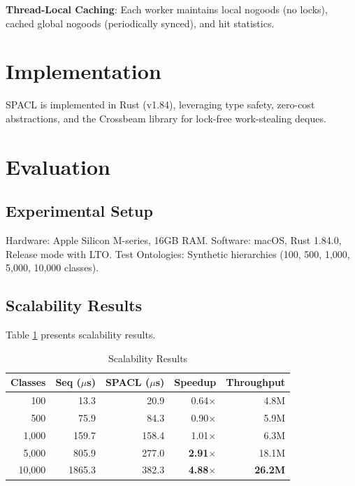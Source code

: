 \documentclass[10pt,a4paper]{article}
\begin{document}
\textbf{Thread-Local Caching}: Each worker maintains local nogoods (no locks), cached global nogoods (periodically synced), and hit statistics.

\section{Implementation}
\label{sec:implementation}

SPACL is implemented in Rust (v1.84), leveraging type safety, zero-cost abstractions, and the Crossbeam library for lock-free work-stealing deques.

\section{Evaluation}
\label{sec:evaluation}

\subsection{Experimental Setup}

Hardware: Apple Silicon M-series, 16GB RAM. Software: macOS, Rust 1.84.0, Release mode with LTO. Test Ontologies: Synthetic hierarchies (100, 500, 1,000, 5,000, 10,000 classes).

\subsection{Scalability Results}

Table \ref{tab:scalability} presents scalability results.

\begin{table}[h]
\centering
\caption{Scalability Results}
\label{tab:scalability}
\begin{tabular}{r|r|r|r|r}
\toprule
\textbf{Classes} & \textbf{Seq ($\mu$s)} & \textbf{SPACL ($\mu$s)} & \textbf{Speedup} & \textbf{Throughput} \\
\midrule
100 & 13.3 & 20.9 & 0.64$\times$ & 4.8M \\
500 & 75.9 & 84.3 & 0.90$\times$ & 5.9M \\
1,000 & 159.7 & 158.4 & 1.01$\times$ & 6.3M \\
5,000 & 805.9 & 277.0 & \textbf{2.91$\times$} & 18.1M \\
10,000 & 1865.3 & 382.3 & \textbf{4.88$\times$} & \textbf{26.2M} \\
\bottomrule
\end{tabular}
\end{table}
\end{document}
